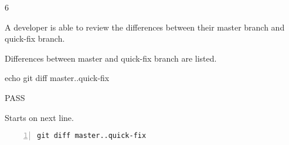 \begin{description}[align=right,leftmargin=3.2cm,labelindent=3.0cm]
\item[Step:] 6
\item[Confirm:] A developer is able to review the differences between their master branch and quick-fix branch.
\item[Expectation:] Differences between master and quick-fix branch are listed.
\item[Command:] echo git  diff master..quick-fix
\item[Test Result:] PASS
\item[Evidence:] Starts on next line.
\end{description}
\begin{lstlisting}[numbers=left]
git diff master..quick-fix

\end{lstlisting}
